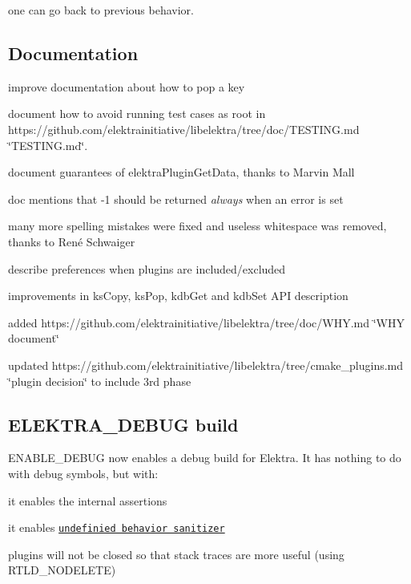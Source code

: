 one can go back to previous behavior.

\subsection*{Documentation}


\begin{DoxyItemize}
\item improve documentation about how to pop a key
\item document how to avoid running test cases as root in https\+://github.com/elektrainitiative/libelektra/tree/doc/\+T\+E\+S\+T\+I\+N\+G.\+md \char`\"{}\+T\+E\+S\+T\+I\+N\+G.\+md\char`\"{}.
\item document guarantees of {\ttfamily elektra\+Plugin\+Get\+Data}, thanks to Marvin Mall
\item doc mentions that -\/1 should be returned {\itshape always} when an error is set
\item many more spelling mistakes were fixed and useless whitespace was removed, thanks to René Schwaiger
\item describe preferences when plugins are included/excluded
\item improvements in {\ttfamily ks\+Copy}, {\ttfamily ks\+Pop}, {\ttfamily kdb\+Get} and {\ttfamily kdb\+Set} A\+P\+I description
\item added https\+://github.com/elektrainitiative/libelektra/tree/doc/\+W\+H\+Y.\+md \char`\"{}\+W\+H\+Y document\char`\"{}
\item updated https\+://github.com/elektrainitiative/libelektra/tree/cmake\+\_\+plugins.\+md \char`\"{}plugin decision\char`\"{} to include 3rd phase
\end{DoxyItemize}

\subsection*{E\+L\+E\+K\+T\+R\+A\+\_\+\+D\+E\+B\+U\+G build}

E\+N\+A\+B\+L\+E\+\_\+\+D\+E\+B\+U\+G now enables a debug build for Elektra. It has nothing to do with debug symbols, but with\+:


\begin{DoxyItemize}
\item it enables the internal assertions
\item it enables \href{http://clang.llvm.org/docs/UndefinedBehaviorSanitizer.html}{\tt undefinied behavior sanitizer}
\item plugins will not be closed so that stack traces are more useful (using R\+T\+L\+D\+\_\+\+N\+O\+D\+E\+L\+E\+T\+E)
\end{DoxyItemize}

